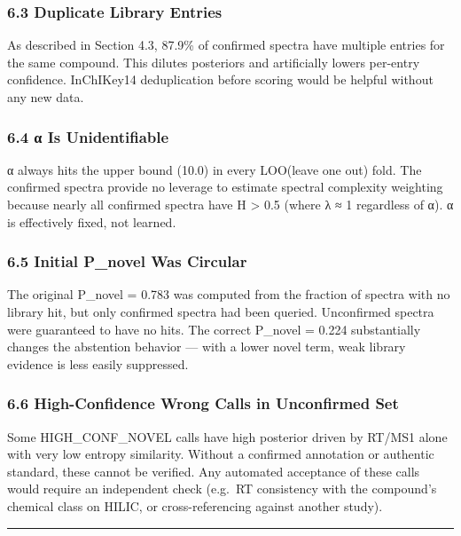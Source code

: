 \subsubsection{6.3 Duplicate Library
Entries}\label{duplicate-library-entries}

As described in Section 4.3, 87.9\% of confirmed spectra have multiple
entries for the same compound. This dilutes posteriors and artificially
lowers per-entry confidence. InChIKey14 deduplication before scoring
would be helpful without any new data.

\subsubsection{6.4 α Is Unidentifiable}\label{ux3b1-is-unidentifiable}

α always hits the upper bound (10.0) in every LOO(leave one out) fold.
The confirmed spectra provide no leverage to estimate spectral
complexity weighting because nearly all confirmed spectra have H
\textgreater{} 0.5 (where λ ≈ 1 regardless of α). α is effectively
fixed, not learned.

\subsubsection{6.5 Initial P\_novel Was
Circular}\label{initial-p_novel-was-circular}

The original P\_novel = 0.783 was computed from the fraction of spectra
with no library hit, but only confirmed spectra had been queried.
Unconfirmed spectra were guaranteed to have no hits. The correct
P\_novel = 0.224 substantially changes the abstention behavior --- with
a lower novel term, weak library evidence is less easily suppressed.

\subsubsection{6.6 High-Confidence Wrong Calls in Unconfirmed
Set}\label{high-confidence-wrong-calls-in-unconfirmed-set}

Some HIGH\_CONF\_NOVEL calls have high posterior driven by RT/MS1 alone
with very low entropy similarity. Without a confirmed annotation or
authentic standard, these cannot be verified. Any automated acceptance
of these calls would require an independent check (e.g.~RT consistency
with the compound's chemical class on HILIC, or cross-referencing
against another study).

\begin{center}\rule{0.5\linewidth}{0.5pt}\end{center}

